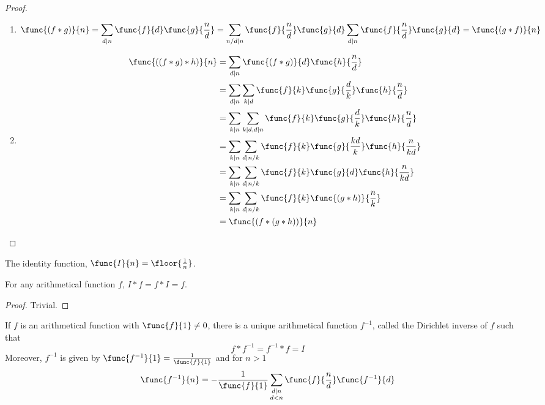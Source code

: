 \begin{proof}
    \ 
    \begin{enumerate}
        \item 
        \begin{equation*}
            \func{(f \ast g)}{n} = \sum_{d \mid n} \func{f}{d} \func{g}{\frac{n}{d}}  = \sum_{n/d \mid n} \func{f}{\frac{n}{d}} \func{g}{d} \sum_{d \mid n} \func{f}{\frac{n}{d}} \func{g}{d} = \func{(g \ast f)}{n}
        \end{equation*}
        \item 
        \begin{align*}
            \func{((f \ast g) \ast h)}{n} &= \sum_{d \mid n} \func{(f \ast g)}{d} \func{h}{\frac{n}{d}}\\
            &= \sum_{d \mid n} \sum_{k \mid d}  \func{f}{k} \func{g}{\frac{d}{k}} \func{h}{\frac{n}{d}}\\
            &= \sum_{k \mid n} \sum_{k \mid d, d \mid n} \func{f}{k} \func{g}{\frac{d}{k}} \func{h}{\frac{n}{d}}\\
            &= \sum_{k \mid n} \sum_{d \mid n/k} \func{f}{k} \func{g}{\frac{kd}{k}} \func{h}{\frac{n}{kd}}\\
            &= \sum_{k \mid n} \sum_{d \mid n/k} \func{f}{k} \func{g}{d} \func{h}{\frac{n}{kd}}\\
            &= \sum_{k \mid n} \sum_{d \mid n/k} \func{f}{k} \func{(g \ast h)}{\frac{n}{k}}\\
            &= \func{(f \ast (g \ast h))}{n}
        \end{align*}
    \end{enumerate}
\end{proof}

\begin{definition}
    The identity function, \(\func{I}{n} = \floor{\frac{1}{n}}\).
\end{definition}
\begin{theorem}
    For any arithmetical function \(f\), \(I \ast f = f \ast I = f\).
\end{theorem}
\begin{proof}
    Trivial.
\end{proof}

\begin{theorem}
    If \(f\) is an arithmetical function with \(\func{f}{1} \neq 0\), there is a unique arithmetical function \(f^{-1}\), called the Dirichlet inverse of \(f\) such that
    \begin{equation*}
        f \ast f^{-1} = f^{-1} \ast f = I
    \end{equation*}
    Moreover, \(f^{-1}\) is given by \(\func{f^{-1}}{1} = \frac{1}{\func{f}{1}}\) and for \(n > 1\)
    \begin{equation*}
        \func{f^{-1}}{n} = -\frac{1}{\func{f}{1}} \sum_{\substack{d \mid n \\ d < n}} \func{f}{\frac{n}{d}} \func{f^{-1}}{d}
    \end{equation*}
\end{theorem}

